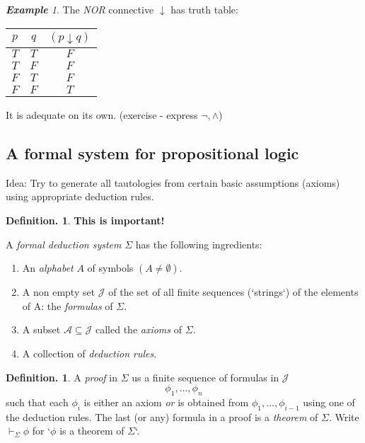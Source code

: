 \documentclass[a4paper,oneside,11pt,DIV=12,parskip=half]{scrartcl}
\theoremstyle{plain}
\theoremstyle{definition}
\newtheorem{definition}[theorem]{Definition.}
\newtheorem{remark, definition}[theorem]{Remark and Definition.}
\newtheorem{lemma, definition}[theorem]{Lemma and Definition.}
\newtheorem{theorem, definition}[theorem]{Theorem and Definition.}
\theoremstyle{remark}
\newtheorem*{example}{\textbf{Example}}
\newtheorem*{remark, example}{\textbf{Remark and Exercise}}
\begin{document}
\begin{example}
The \emph{NOR} connective $\downarrow$ has truth table:
    \begin{tabular}{c|c|c}
        $p$ & $q$ & $(p \downarrow q)$ \\
        \hline
        $T$ & $T$ & $F$ \\ 
        $T$ & $F$ & $F$ \\
        $F$ & $T$ & $F$ \\
        $F$ & $F$ & $T$ \\
        
    \end{tabular}
    It is adequate on its own. (exercise - express $\lnot, \land$)
\end{example}

\subsection{A formal system for propositional logic}

Idea: Try to generate all tautologies from certain basic assumptions (axioms) using appropriate deduction rules.

\begin{definition}
\textbf{This is important!}

A \emph{formal deduction system} $\Sigma$ has the following ingredients:
\begin{enumerate}
    \item An \emph{alphabet} $A$ of symbols $(A \neq \emptyset)$.
    \item A non empty set $\mathcal{J}$ of the set of all finite sequences (`strings`) of the elements of A: the \emph{formulas} of $\Sigma$.
    \item A subset $\mathcal{A} \subseteq \mathcal{J}$ called the \emph{axioms} of $\Sigma$. 
    \item A collection of \emph{deduction rules}.
\end{enumerate}
\end{definition}

\begin{definition}
A \emph{proof} in $\Sigma$ us a finite sequence of formulas in $\mathcal{J}$ \[ \phi_1,\dots,\phi_n \] such that each $ \phi_i $ is either an axiom \emph{or} is obtained from $ \phi_1, \dots, \phi_{i-1} $ using one of the deduction rules. The last (or any) formula in a proof is a \emph{theorem} of $\Sigma$.
Write $\vdash_\Sigma \phi$ for `$\phi$ is a theorem of $\Sigma$`. 
\end{definition}
\end{document}
